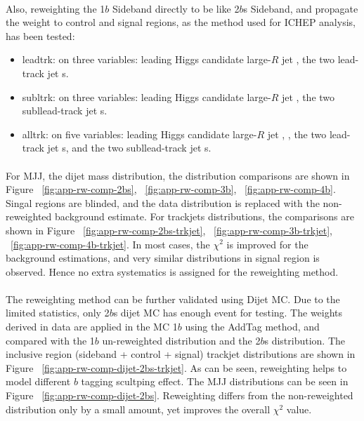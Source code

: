 \paragraph{}
Also, reweighting the 1$b$ Sideband directly to be like 2$b$s Sideband, and propagate the weight to control and signal regions, as the method used for ICHEP analysis, has been tested:
\begin{itemize}
	\item leadtrk: on three variables: leading Higgs candidate large-$R$ jet \pt, the two lead-track jet \pt s.
	\item subltrk: on three variables: leading Higgs candidate large-$R$ jet \pt, the two subllead-track jet \pt s.
	\item alltrk: on five variables: leading Higgs candidate large-$R$ jet \pt, , the two lead-track jet \pt s, and the two subllead-track jet \pt s.
\end{itemize}

\paragraph{}
For MJJ, the dijet mass distribution, the distribution comparisons are shown in Figure ~\ref{fig:app-rw-comp-2bs}, ~\ref{fig:app-rw-comp-3b}, ~\ref{fig:app-rw-comp-4b}. Singal regions are blinded, and the data distribution is replaced with the non-reweighted background estimate. For trackjets \pt distributions, the comparisons are shown in Figure ~\ref{fig:app-rw-comp-2bs-trkjet}, ~\ref{fig:app-rw-comp-3b-trkjet}, ~\ref{fig:app-rw-comp-4b-trkjet}. In most cases, the $\chi^2$ is improved for the background estimations, and very similar distributions in signal region is observed. Hence no extra systematics is assigned for the reweighting method.

\paragraph{}
The reweighting method can be further validated using Dijet MC. Due to the limited statistics, only 2$b$s dijet MC has enough event for testing. The weights derived in data are applied in the MC 1$b$ using the AddTag method, and compared with the 1$b$ un-reweighted distribution and the 2$b$s distribution. The inclusive region (sideband + control + signal) trackjet \pt distributions are shown in Figure ~\ref{fig:app-rw-comp-dijet-2bs-trkjet}. As can be seen, reweighting helps to model different $b$ tagging scultping effect. The MJJ distributions can be seen in Figure ~\ref{fig:app-rw-comp-dijet-2bs}. Reweighting differs from the non-reweighted distribution only by a small amount, yet improves the overall $\chi^2$ value.

